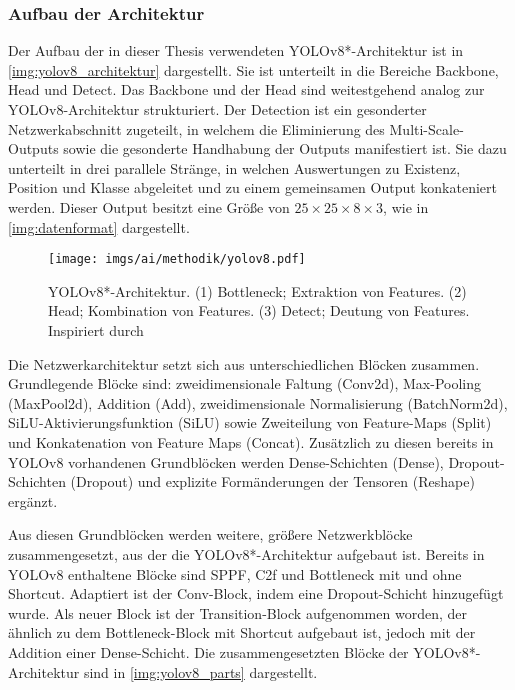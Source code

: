 \subsubsection{Aufbau der Architektur}
\label{sec:yolov8_aufbau}

Der Aufbau der in dieser Thesis verwendeten YOLOv8*-Architektur ist in \autoref{img:yolov8_architektur} dargestellt. Sie ist unterteilt in die Bereiche Backbone, Head und Detect. Das Backbone und der Head sind weitestgehend analog zur YOLOv8-Architektur strukturiert. Der Detection ist ein gesonderter Netzwerkabschnitt zugeteilt, in welchem die Eliminierung des Multi-Scale-Outputs sowie die gesonderte Handhabung der Outputs manifestiert ist. Sie dazu unterteilt in drei parallele Stränge, in welchen Auswertungen zu Existenz, Position und Klasse abgeleitet und zu einem gemeinsamen Output konkateniert werden. Dieser Output besitzt eine Größe von $25 \times 25 \times 8 \times 3$, wie in \autoref{img:datenformat} dargestellt.

\begin{figure}
    \centering
    \texttt{[image: imgs/ai/methodik/yolov8.pdf]}
    \caption{YOLOv8*-Architektur. (1) Bottleneck; Extraktion von Features. (2) Head; Kombination von Features. (3) Detect; Deutung von Features. Inspiriert durch \citeauthor{yolo_model_visualization_inspration} \cite{yolo_model_visualization_inspration}}
    \label{img:yolov8_architektur}
\end{figure}

Die Netzwerkarchitektur setzt sich aus unterschiedlichen Blöcken zusammen. Grundlegende Blöcke sind: zweidimensionale Faltung (Conv2d), Max-Pooling (MaxPool2d), Addition (Add), zweidimensionale Normalisierung (BatchNorm2d), SiLU-Aktivierungsfunktion (SiLU) sowie Zweiteilung von Feature-Maps (Split) und Konkatenation von Feature Maps (Concat). Zusätzlich zu diesen bereits in YOLOv8 vorhandenen Grundblöcken werden Dense-Schichten (Dense), Dropout-Schichten (Dropout) und explizite Formänderungen der Tensoren (Reshape) ergänzt.

Aus diesen Grundblöcken werden weitere, größere Netzwerkblöcke zusammengesetzt, aus der die YOLOv8*-Architektur aufgebaut ist. Bereits in YOLOv8 enthaltene Blöcke sind SPPF, C2f und Bottleneck mit und ohne Shortcut. Adaptiert ist der Conv-Block, indem eine Dropout-Schicht hinzugefügt wurde. Als neuer Block ist der Transition-Block aufgenommen worden, der ähnlich zu dem Bottleneck-Block mit Shortcut aufgebaut ist, jedoch mit der Addition einer Dense-Schicht. Die zusammengesetzten Blöcke der YOLOv8*-Architektur sind in \autoref{img:yolov8_parts} dargestellt.

